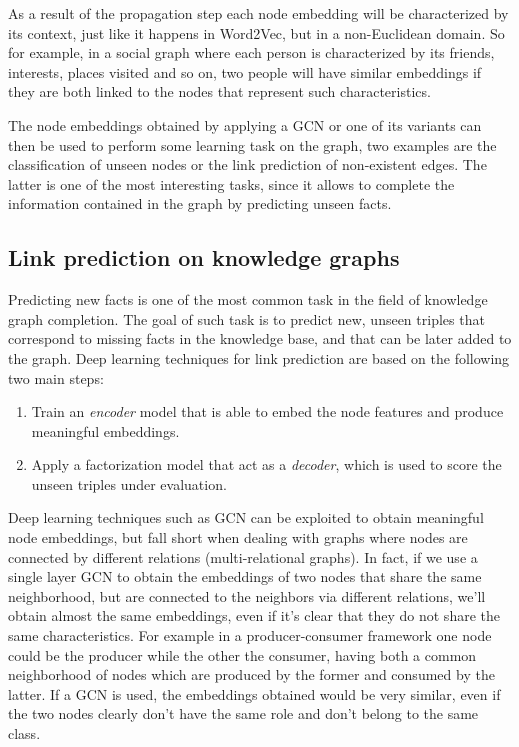 \documentclass[%
    corpo=13.5pt,
    twoside,
    oldstyle,
    tipotesi=magistrale,
    greek,
    evenboxes
]{toptesi}
\begin{document}
As a result of the propagation step each node embedding will be characterized by
its context, just like it happens in Word2Vec, but in a non-Euclidean domain.
So for example, in a social graph where each person is characterized by its
friends, interests, places visited and so on, two people will have similar
embeddings if they are both linked to the nodes that represent such
characteristics.

The node embeddings obtained by applying a GCN or one of its variants can
then be used to perform some learning task on the graph, two examples are
the classification of unseen nodes or the link prediction of non-existent
edges. The latter is one of the most interesting tasks, since it allows to
complete the information contained in the graph by predicting unseen facts.

\subsection{Link prediction on knowledge graphs}
\label{subsec:linkprediction}

Predicting new facts is one of the most common task in the field
of knowledge graph completion. The goal of such task is to predict new, unseen
triples that correspond to missing facts in the knowledge base, and that can be
later added to the graph.
Deep learning techniques for link prediction are based on the following two
main steps:

\begin{enumerate}
    \item Train an \emph{encoder} model
    that is able to embed the node features and produce meaningful embeddings.
    \item Apply a factorization model that act as a \emph{decoder}, which is
    used to score the unseen triples under evaluation.
\end{enumerate}

Deep learning techniques such as GCN can be exploited to obtain meaningful
node embeddings, but fall short when dealing with graphs where
nodes are connected by different relations (multi-relational graphs).
In fact, if we use a single layer GCN to obtain the embeddings of two nodes
that share the same neighborhood, but are connected to the neighbors via
different relations, we'll obtain almost the same embeddings, even if it's
clear that they do not share the same characteristics. For example in a
producer-consumer framework one node could be the producer while the other
the consumer, having both a common neighborhood of nodes
which are produced by the former and consumed by the latter.
If a GCN is used, the embeddings obtained would be very similar, even if
the two nodes clearly don't have the same role and don't belong to the
same class.
\end{document}
